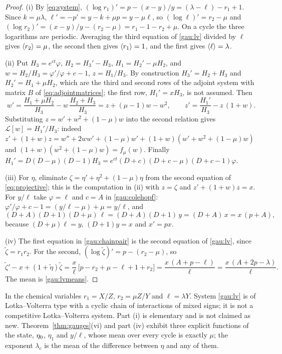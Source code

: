 \begin{proof}
(i) By \eqref{eq:system}, $(\log r_1)'=p-(x-y)/y=(\lambda-\ell)-r_1+1$. Since $k=\mu\lambda$, $\ell'=-p'=y-k+\mu p=y-\mu\ell$, so $(\log\ell)'=r_2-\mu$ and $(\log r_2)'=(x-y)/y-(r_2-\mu)=r_1-1-r_2+\mu$. On a cycle the three logarithms are periodic. Averaging the third equation of \eqref{gau:lv} divided by $\ell$ gives $\left\langle r_2\right\rangle=\mu$, the second then gives $\left\langle r_1\right\rangle=1$, and the first gives $\left\langle \ell\right\rangle=\lambda$.

(ii) Put $H_3=e^{ct}\varphi$, $H_2=H_3'-H_3$, $H_1=H_2'-\mu H_2$, and $w=H_2/H_3=\varphi'/\varphi+c-1$, $z=H_1/H_3$. By construction $H_3'=H_2+H_3$ and $H_2'=H_1+\mu H_2$, which are the third and second rows of the adjoint system with matrix $B$ of \eqref{eq:adjointmatrices}; the first row, $H_1'=xH_3$, is not assumed. Then
\[
w'=\frac{H_1+\mu H_2}{H_3}-w\,\frac{H_2+H_3}{H_3}=z+(\mu-1)w-w^2,\qquad
z'=\frac{H_1'}{H_3}-z\,(1+w).
\]
Substituting $z=w'+w^2+(1-\mu)w$ into the second relation gives $\mathcal L[w]=H_1'/H_3$: indeed $z'+(1+w)z=w''+2ww'+(1-\mu)w'+(1+w)(w'+w^2+(1-\mu)w)$ and $(1+w)(w^2+(1-\mu)w)=f_\mu(w)$. Finally $H_1'=D(D-\mu)(D-1)H_3=e^{ct}(D+c)(D+c-\mu)(D+c-1)\varphi$.

(iii) For $\eta$, eliminate $\zeta=\eta'+\eta^2+(1-\mu)\eta$ from the second equation of \eqref{eq:projective}; this is the computation in (ii) with $z=\zeta$ and $z'+(1+w)z=x$. For $y/\ell$ take $\varphi=\ell$ and $c=A$ in \eqref{gau:colehopf}: $\varphi'/\varphi+c-1=(y/\ell-\mu)+\mu=y/\ell$, and
\[
(D+A)(D+1)(D+\mu)\,\ell=(D+A)(D+1)\,y=(D+A)\,x=x\,(p+A),
\]
because $(D+\mu)\ell=y$, $(D+1)y=x$ and $x'=px$.

(iv) The first equation in \eqref{gau:chainpair} is the second equation of \eqref{gau:lv}, since $\tilde\zeta=r_1r_2$. For the second, $(\log\tilde\zeta)'=p-(r_2-\mu)$, so
\[
\tilde\zeta'-x+(1+\tilde\eta)\tilde\zeta=\frac x\ell\,\bigl[p-r_2+\mu-\ell+1+r_2\bigr]=\frac{x\,(A+p-\ell)}{\ell}=\frac{x\,(A+2p-\lambda)}{\ell}.
\]
The mean is \eqref{gau:lvmeans}.
\end{proof}
In the chemical variables $r_1=X/Z$, $r_2=\mu Z/Y$ and $\ell=\lambda Y$. System \eqref{gau:lv} is of Lotka--Volterra type with a cyclic chain of interactions of mixed signs; it is not a competitive Lotka--Volterra system. Part (i) is elementary and is not claimed as new. Theorem~\ref{thm:gauges}(vi) and part (iv) exhibit three explicit functions of the state, $\eta_0$, $\eta_1$ and $y/\ell$, whose mean over every cycle is exactly $\mu$; the exponent $\lambda_c$ is the mean of the difference between $\eta$ and any of them.

